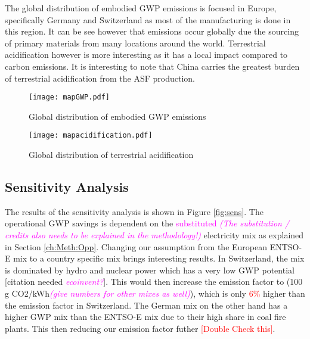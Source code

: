 The global distribution of embodied GWP emissions is focused in Europe, specifically Germany and Switzerland as most of the manufacturing is done in this region. It can be see however that emissions occur globally due the sourcing of primary materials from many locations around the world. Terrestrial acidification however is more interesting as it has a local impact compared to carbon emissions. It is interesting to note that China carries the greatest burden of terrestrial acidification from the ASF production. 
\begin{figure}[H]
\begin{center}
\texttt{[image: mapGWP.pdf]}
\caption{Global distribution of embodied GWP emissions}
\label{fig:mapGWP}
\end{center}
\end{figure}

\begin{figure}[H]
\begin{center}
\texttt{[image: mapacidification.pdf]}
\caption{Global distribution of terrestrial acidification}
\label{fig:mapAcid}
\end{center}
\end{figure}


\subsection{Sensitivity Analysis}

The results of the sensitivity analysis is shown in Figure \ref{fig:sens}. The operational GWP savings is dependent on the \textcolor{magenta}{substituted \textit{(The substitution / credits also needs to be explained in the methodology!)}} electricity mix as explained in Section \ref{ch:Meth:Opp}. Changing our assumption from the European ENTSO-E mix to a country specific mix brings interesting results. In Switzerland, the mix is dominated by hydro and nuclear power which has a very low GWP potential [citation needed \textcolor{magenta}{ \textit{ecoinvent?}}]. This would then increase the emission factor to (100 g CO2/kWh\textcolor{magenta}{\textit{(give numbers for other mixes as well)}}), which is only \textcolor{red}{6\%} higher than the emission factor in Switzerland. The German mix on the other hand has a higher GWP mix than the ENTSO-E mix due to their high share in coal fire plants. This then reducing our emission factor futher \textcolor{red}{[Double Check this]}.\\

